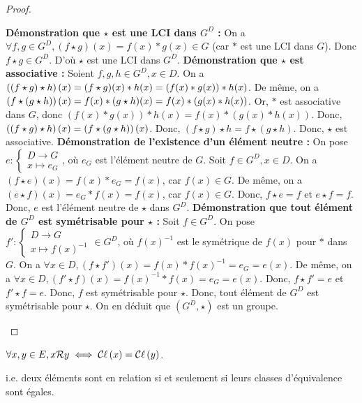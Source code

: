 \documentclass[12pt,a4paper]{report}
\begin{document}
\begin{proof}
    \begin{outline}
        \1 \textbf{Démonstration que $\star$ est une LCI dans $G^D$ :}
        \2 On a $\forall f,g \in G^D, (f \star g)(x)=f(x) * g(x) \in G$ (car $*$ est une LCI dans $G$).
        \2 Donc $f \star g \in G^D$.
        \2 D'où $\star$ est une LCI dans $G^D$.
        \1 \textbf{Démonstration que $\star$ est associative :}
        \2 Soient $f,g,h \in G^D,x\in D$.
        \2 On a $\left((f \star g) \star h\right)(x) = (f \star g)(x) * h(x) = (f(x) * g(x)) * h(x)$.
        \2 De même, on a $\left(f \star (g \star h)\right)(x) = f(x) * (g \star h)(x) = f(x) * (g(x) * h(x))$.
        \2 Or, $*$ est associative dans $G$, donc $(f(x) * g(x)) * h(x) = f(x) * (g(x) * h(x))$.
        \2 Donc, $\left((f \star g) \star h\right)(x) = \left(f \star (g \star h)\right)(x)$.
        \2 Donc, $(f \star g) \star h = f \star (g \star h)$.
        \2 Donc, $\star$ est associative.
        \1 \textbf{Démonstration de l'existence d'un élément neutre :}
        \2 On pose $e : \begin{cases}D \to G\\x \mapsto e_G\end{cases}$, où $e_G$ est l'élément neutre de $G$.
        \2 Soit $f \in G^D, x \in D$.
        \2 On a $(f \star e)(x) = f(x) * e_G = f(x)$, car $f(x) \in G$.
        \2 De même, on a $(e \star f)(x) = e_G * f(x) = f(x)$, car $f(x) \in G$.
        \2 Donc, $f \star e = f$ et $e \star f = f$.
        \2 Donc, $e$ est l'élément neutre de $\star$ dans $G^D$.
        \1 \textbf{Démonstration que tout élément de $G^D$ est symétrisable pour $\star$ :}
        \2 Soit $f \in G^D$.
        \2 On pose $f' : \begin{cases}D \to G\\x \mapsto f(x)^{-1}\end{cases} \in G^D$, où $f(x)^{-1}$ est le symétrique de $f(x)$ pour $*$ dans $G$.
        \2 On a $\forall x \in D, (f \star f')(x) = f(x) * f(x)^{-1} = e_G = e(x)$.
        \2 De même, on a $\forall x \in D, (f' \star f)(x) = f(x)^{-1} * f(x) = e_G = e(x)$.
        \2 Donc, $f \star f' = e$ et $f' \star f = e$.
        \2 Donc, $f$ est symétrisable pour $\star$.
        \2 Donc, tout élément de $G^D$ est symétrisable pour $\star$.
        \1 On en déduit que $(G^D, \star)$ est un groupe.
    \end{outline}
\end{proof}

\begin{property}
    $\forall x,y \in E, x\mathcal{R}y \iff \mathcal{C}\ell\left(x\right) = \mathcal{C}\ell\left(y\right)$.

    i.e. deux éléments sont en relation si et seulement si leurs classes d'équivalence sont égales.
\end{property}
\end{document}
